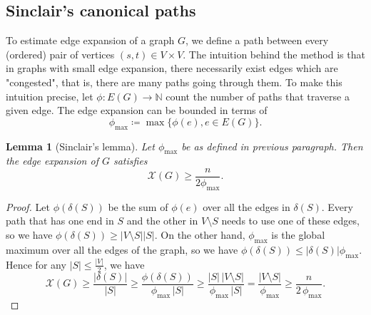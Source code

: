 \documentclass[a4paper,12pt]{book}
\theoremstyle{plain}
\newtheorem{lemma}[theorem]{Lemma}
\theoremstyle{definition}
\begin{document}
\subsection{Sinclair's canonical paths}

To estimate edge expansion of a graph $G$, we define a path between every (ordered) pair of vertices $(s,t) \in V \times V$.
The intuition behind the method is that in graphs with small edge expansion, there necessarily exist edges which are "congested", that is, there
are many paths going through them. To make this intuition precise, let $\phi: E(G) \rightarrow \mathbb{N}$ count the number of paths
that traverse a given edge. The edge expansion can be bounded 
in terms of
\begin{equation}
\phi_{\max} \coloneqq \max \{ \phi(e), e \in E(G) \}.
\end{equation}


\begin{lemma}[Sinclair's lemma]
\label{Sinclair}
Let $\phi_{\max}$ be as defined in previous paragraph. Then the edge expansion of $G$ satisfies 
\begin{equation}
\mathcal{X}(G) \ge \frac{n}{2 \phi_{\max}}.
\end{equation}
\end{lemma}

\begin{proof}
Let $\phi(\delta(S))$ be the sum of $\phi(e)$ over all the edges in $\delta(S)$. Every path that has one end in $S$
and the other in $V\setminus S$ needs to use one of these edges, so we have $\phi(\delta(S)) \ge   |V\setminus S | |S |$.
On the other hand, $\phi_{\max}$ is the global maximum over all the edges of the graph, so we have $\phi(\delta(S)) \le  |\delta(S) |\phi_{\max}$.
Hence for any $|S| \le \frac{ |V |}{2}$, we have
\begin{equation}
\label{sepbound}
 \mathcal{X}(G) \ge \frac{|\delta(S)|}{|S|} 
                \ge \frac{\phi(\delta(S))}{\phi_{\max}\,|S|}
                \ge \frac{|S|\,|V{\setminus}S|}{\phi_{\max}\,|S|}
                 =  \frac{|V{\setminus}S|}{\phi_{\max}}
				\ge \frac{n}{2\,\phi_{\max}}.
\end{equation}
\end{proof} 
\end{document}
